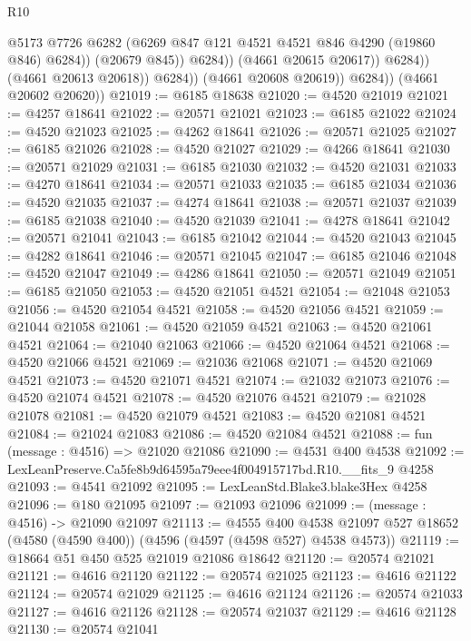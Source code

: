 \begin{lexlean}{R10}
\begin{coremodule}
                                @5173
                                @7726
                                @6282
                                (@6269 @847 @121 @4521 @4521 @846 @4290 (@19860 @846) @6284))
                              (@20679 @845))
                            @6284))
                        (@4661 @20615 @20617))
                      @6284))
                  (@4661 @20613 @20618))
                @6284))
            (@4661 @20608 @20619))
          @6284))
      (@4661 @20602 @20620))
@21019 := @6185 @18638
@21020 := @4520 @21019
@21021 := @4257 @18641
@21022 := @20571 @21021
@21023 := @6185 @21022
@21024 := @4520 @21023
@21025 := @4262 @18641
@21026 := @20571 @21025
@21027 := @6185 @21026
@21028 := @4520 @21027
@21029 := @4266 @18641
@21030 := @20571 @21029
@21031 := @6185 @21030
@21032 := @4520 @21031
@21033 := @4270 @18641
@21034 := @20571 @21033
@21035 := @6185 @21034
@21036 := @4520 @21035
@21037 := @4274 @18641
@21038 := @20571 @21037
@21039 := @6185 @21038
@21040 := @4520 @21039
@21041 := @4278 @18641
@21042 := @20571 @21041
@21043 := @6185 @21042
@21044 := @4520 @21043
@21045 := @4282 @18641
@21046 := @20571 @21045
@21047 := @6185 @21046
@21048 := @4520 @21047
@21049 := @4286 @18641
@21050 := @20571 @21049
@21051 := @6185 @21050
@21053 := @4520 @21051 @4521
@21054 := @21048 @21053
@21056 := @4520 @21054 @4521
@21058 := @4520 @21056 @4521
@21059 := @21044 @21058
@21061 := @4520 @21059 @4521
@21063 := @4520 @21061 @4521
@21064 := @21040 @21063
@21066 := @4520 @21064 @4521
@21068 := @4520 @21066 @4521
@21069 := @21036 @21068
@21071 := @4520 @21069 @4521
@21073 := @4520 @21071 @4521
@21074 := @21032 @21073
@21076 := @4520 @21074 @4521
@21078 := @4520 @21076 @4521
@21079 := @21028 @21078
@21081 := @4520 @21079 @4521
@21083 := @4520 @21081 @4521
@21084 := @21024 @21083
@21086 := @4520 @21084 @4521
@21088 := fun (message : @4516) => @21020 @21086
@21090 := @4531 @400 @4538
@21092 := LexLeanPreserve.Ca5fe8b9d64595a79eee4f004915717bd.R10.__fits_9 @4258
@21093 := @4541 @21092
@21095 := LexLeanStd.Blake3.blake3Hex @4258
@21096 := @180 @21095
@21097 := @21093 @21096
@21099 := (message : @4516) -> @21090 @21097
@21113 := @4555
    @400
    @4538
    @21097
    @527
    @18652
    (@4580 (@4590 @400))
    (@4596 (@4597 (@4598 @527) @4538 @4573))
@21119 := @18664 @51 @450 @525 @21019 @21086 @18642
@21120 := @20574 @21021
@21121 := @4616 @21120
@21122 := @20574 @21025
@21123 := @4616 @21122
@21124 := @20574 @21029
@21125 := @4616 @21124
@21126 := @20574 @21033
@21127 := @4616 @21126
@21128 := @20574 @21037
@21129 := @4616 @21128
@21130 := @20574 @21041

\end{coremodule}
\end{lexlean}
